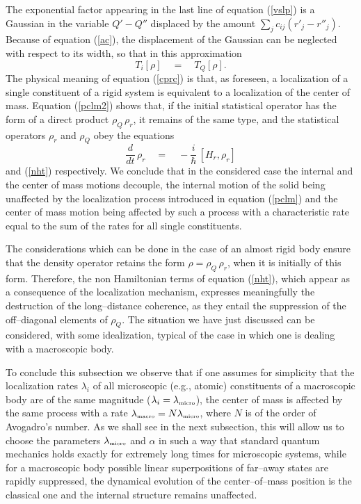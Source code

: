 \documentclass[12pt]{article}
\begin{document}
The exponential factor appearing in the last line of equation
(\ref{vslp}) is a Gaussian in the variable $Q' - Q''$ displaced by
the amount $\sum_{j} c_{ij} ({r'}_{j} - {r''}_{j})$. Because of
equation (\ref{ac}), the displacement of the Gaussian can be
neglected with respect to its width, so that in this approximation
\begin{equation} \label{cprc}
T_{i}[\rho] \quad = \quad T_{Q}[\rho].
\end{equation}
The physical meaning of equation (\ref{cprc}) is that, as
foreseen, a localization of a single constituent of a rigid system
is equivalent to a localization of the center  of mass. Equation
(\ref{pclm2}) shows that, if the initial statistical operator has
the form of a direct product $\rho_{Q}\, \rho_{r}$, it remains of
the same type, and the statistical operators $\rho_{r}$ and
$\rho_{Q}$ obey the equations
\begin{equation} \label{yjth}
\frac{d}{dt}\, \rho_{r} \quad = \quad -\frac{i}{\hbar}\, [H_{r},
\rho_{r}]
\end{equation}
and (\ref{nht}) respectively. We conclude that in the considered
case the internal and the center of mass motions decouple, the
internal motion of the solid being unaffected by the localization
process introduced in equation (\ref{pclm}) and the center of mass
motion being affected by such a process with a characteristic rate
equal to the sum of the rates for all single constituents.

The considerations which can be done in the case of an almost
rigid body ensure that the density operator retains the form $\rho
= \rho_{Q} \, \rho_{r}$, when it is initially of this form.
Therefore, the non Hamiltonian terms of equation (\ref{nht}),
which appear as a consequence of the localization mechanism,
expresses meaningfully the destruction of the long--distance
coherence, as they entail the suppression of the off--diagonal
elements of $\rho_{Q}$. The situation we have just discussed can
be considered, with some idealization, typical of the case in
which one is dealing with a macroscopic body.

To conclude this subsection we observe that if one assumes for
simplicity that the localization rates $\lambda_{i}$ of all
microscopic (e.g., atomic) constituents of a macroscopic body are
of the same magnitude ($\lambda_{i} = \lambda_{\makebox{\tiny
micro}}$), the center of mass is affected by the same process with
a rate $\lambda_{\makebox{\tiny macro}} = N\lambda_{\makebox{\tiny
micro}}$, where $N$ is of the order of Avogadro's number. As we
shall see in the next subsection, this will allow us to choose the
parameters $\lambda_{\makebox{\tiny micro}}$ and $\alpha$ in such
a way that standard quantum mechanics holds exactly for extremely
long times for microscopic systems, while for a macroscopic body
possible linear superpositions of far--away states are rapidly
suppressed, the dynamical evolution of the center--of--mass
position is the classical one and the internal structure remains
unaffected.
\end{document}
